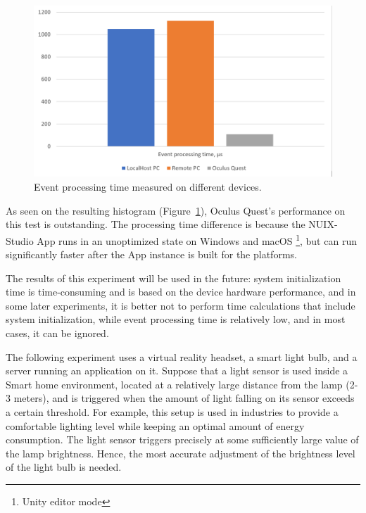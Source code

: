 \begin{figure}
  \centering
  \includegraphics[width = 0.9 \linewidth]{figures/EventProcessingTime.png}
  \caption{Event processing time measured on different devices.}
  \label{fig:EventProcessingTime-figure}
\end{figure}

As seen on the resulting histogram (Figure~\ref{fig:EventProcessingTime-figure}), Oculus Quest's performance on this test is outstanding. The processing time difference is because the NUIX-Studio App runs in an unoptimized state on Windows and macOS \footnote{Unity editor mode}, but can run significantly faster after the App instance is built for the platforms.

The results of this experiment will be used in the future: system initialization time is time-consuming and is based on the device hardware performance, and in some later experiments, it is better not to perform time calculations that include system initialization, while event processing time is relatively low, and in most cases, it can be ignored.

The following experiment uses a virtual reality headset, a smart light bulb, and a server running an application on it. Suppose that a light sensor is used inside a Smart home environment, located at a relatively large distance from the lamp (2-3 meters), and is triggered when the amount of light falling on its sensor exceeds a certain threshold. For example, this setup is used in industries to provide a comfortable lighting level while keeping an optimal amount of energy consumption. The light sensor triggers precisely at some sufficiently large value of the lamp brightness. Hence, the most accurate adjustment of the brightness level of the light bulb is needed.

